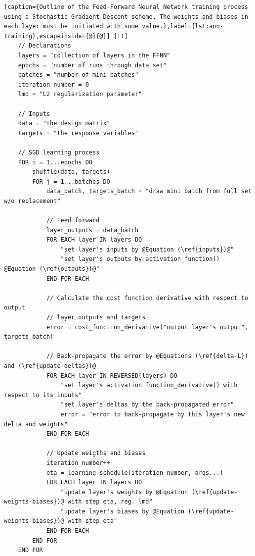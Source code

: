 \documentclass[]{article}
\begin{document}
	\begin{lstlisting}[caption={Outline of the Feed-Forward Neural Network training process using a Stochastic Gradient Descent scheme. The weights and biases in each layer must be initiated with some value.},label={lst:ann-training},escapeinside={@}{@}] [!t]
	// Declarations
	layers = "collection of layers in the FFNN"
	epochs = "number of runs through data set"
	batches = "number of mini batches"
	iteration_number = 0
	lmd = "L2 regularization parameter"
	
	// Inputs
	data = "the design matrix"
	targets = "the response variables"
	
	// SGD learning process
	FOR i = 1...epochs DO
		shuffle(data, targets)
		FOR j = 1...batches DO
			data_batch, targets_batch = "draw mini batch from full set w/o replacement"
			
			// Feed forward
			layer_outputs = data_batch			
			FOR EACH layer IN layers DO
				"set layer's inputs by @Equation (\ref{inputs})@"
				"set layer's outputs by activation_function() @Equation (\ref{outputs})@"
			END FOR EACH
			
			// Calculate the cost function derivative with respect to output
			// layer outputs and targets
			error = cost_function_derivative("output layer's output", targets_batch)
			
			// Back-propagate the error by @Equations (\ref{delta-L}) and (\ref{update-deltas})@
			FOR EACH layer IN REVERSED(layers) DO
				"set layer's activation function_derivative() with respect to its inputs"
				"set layer's deltas by the back-propagated error"
				error = "error to back-propagate by this layer's new delta and weights"
			END FOR EACH		
			
			// Update weigths and biases
			iteration_number++
			eta = learning_schedule(iteration_number, args...)
			FOR EACH layer IN layers DO
				"update layer's weights by @Equation (\ref{update-weights-biases})@ with step eta, reg. lmd"
				"update layer's biases by @Equation (\ref{update-weights-biases})@ with step eta"
			END FOR EACH
		END FOR
	END FOR
	\end{lstlisting}
\end{document}
